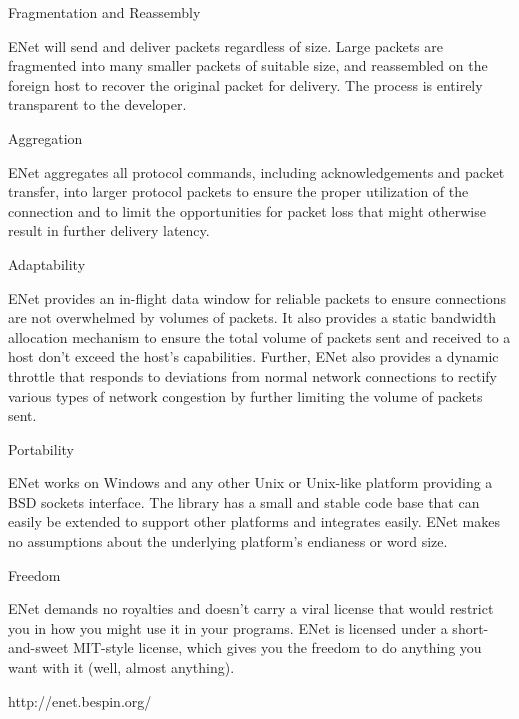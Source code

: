 Fragmentation and Reassembly

ENet will send and deliver packets regardless of size. Large packets are fragmented into many smaller packets of suitable size, and reassembled on the foreign host to recover the original packet for delivery. The process is entirely transparent to the developer.

Aggregation

ENet aggregates all protocol commands, including acknowledgements and packet transfer, into larger protocol packets to ensure the proper utilization of the connection and to limit the opportunities for packet loss that might otherwise result in further delivery latency.

Adaptability

ENet provides an in-flight data window for reliable packets to ensure connections are not overwhelmed by volumes of packets. It also provides a static bandwidth allocation mechanism to ensure the total volume of packets sent and received to a host don't exceed the host's capabilities. Further, ENet also provides a dynamic throttle that responds to deviations from normal network connections to rectify various types of network congestion by further limiting the volume of packets sent.

Portability

ENet works on Windows and any other Unix or Unix-like platform providing a BSD sockets interface. The library has a small and stable code base that can easily be extended to support other platforms and integrates easily. ENet makes no assumptions about the underlying platform's endianess or word size.

Freedom

ENet demands no royalties and doesn't carry a viral license that would restrict you in how you might use it in your programs. ENet is licensed under a short-and-sweet MIT-style license, which gives you the freedom to do anything you want with it (well, almost anything).

http://enet.bespin.org/
